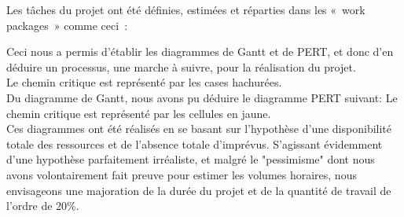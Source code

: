  	\newpage

	Les tâches du projet ont été définies, estimées et réparties dans les « work packages » comme ceci :\\


	\vspace{15pt}

	Ceci nous a permis d'établir les diagrammes de Gantt et de PERT, et donc d’en déduire un processus, une marche à suivre, pour la réalisation du projet.\\

	\vspace{15pt}
	Le chemin critique est représenté par les cases hachurées.\\

	Du diagramme de Gantt, nous avons pu déduire le diagramme PERT suivant:
	\vspace{15pt}
	Le chemin critique est représenté par les cellules en jaune.\\

	Ces diagrammes ont été réalisés en se basant sur l’hypothèse d'une disponibilité totale des ressources et de l'absence totale d'imprévus. S'agissant évidemment d'une hypothèse parfaitement irréaliste, et malgré le "pessimisme" dont nous avons volontairement fait preuve pour estimer les volumes horaires, nous envisageons une majoration de la durée du projet et de la quantité de travail de l’ordre de 20\%.